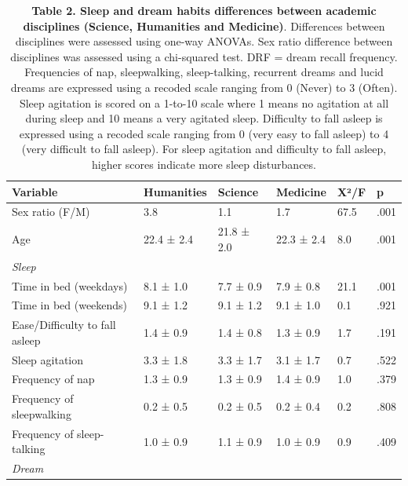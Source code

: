 
\begin{table}[!htbp]
    \caption*{\textbf{Table 2. Sleep and dream habits differences between academic disciplines (Science, Humanities and Medicine)}. Differences between disciplines were assessed using one-way ANOVAs. Sex ratio difference between disciplines was assessed using a chi-squared test. DRF = dream recall frequency. Frequencies of nap, sleepwalking, sleep-talking, recurrent dreams and lucid dreams are expressed using a recoded scale ranging from 0 (Never) to 3 (Often). Sleep agitation is scored on a 1-to-10 scale where 1 means no agitation at all during sleep and 10 means a very agitated sleep. Difficulty to fall asleep is expressed using a recoded scale ranging from 0 (very easy to fall asleep) to 4 (very difficult to fall asleep). For sleep agitation and difficulty to fall asleep, higher scores indicate more sleep disturbances.}
    \begin{tabularx}{\textwidth}{bXXXll}
    \toprule
    Variable                       & Humanities & Science    & Medicine   & X²/F   & p    \\ \midrule
    Sex ratio (F/M)                & 3.8        & 1.1        & 1.7        & 67.5   & .001 \\
    Age                            & 22.4 ± 2.4 & 21.8 ± 2.0 & 22.3 ± 2.4 & 8.0    & .001 \\
    \emph{Sleep}                   &            &            &            &        &      \\
    Time in bed (weekdays)         & 8.1 ± 1.0  & 7.7 ± 0.9  & 7.9 ± 0.8  & 21.1   & .001 \\
    Time in bed (weekends)         & 9.1 ± 1.2  & 9.1 ± 1.2  & 9.1 ± 1.0  & 0.1    & .921 \\
    Ease/Difficulty to fall asleep & 1.4 ± 0.9  & 1.4 ± 0.8  & 1.3 ± 0.9  & 1.7    & .191 \\
    Sleep agitation                & 3.3 ± 1.8  & 3.3 ± 1.7  & 3.1 ± 1.7  & 0.7    & .522 \\
    Frequency of nap               & 1.3 ± 0.9  & 1.3 ± 0.9  & 1.4 ± 0.9  & 1.0    & .379 \\
    Frequency of sleepwalking      & 0.2 ± 0.5  & 0.2 ± 0.5  & 0.2 ± 0.4  & 0.2    & .808 \\
    Frequency of sleep-talking     & 1.0 ± 0.9  & 1.1 ± 0.9  & 1.0 ± 0.9  & 0.9    & .409 \\
    \emph{Dream}                   &            &            &            &        &      \\

\end{tabularx}
\end{table}

